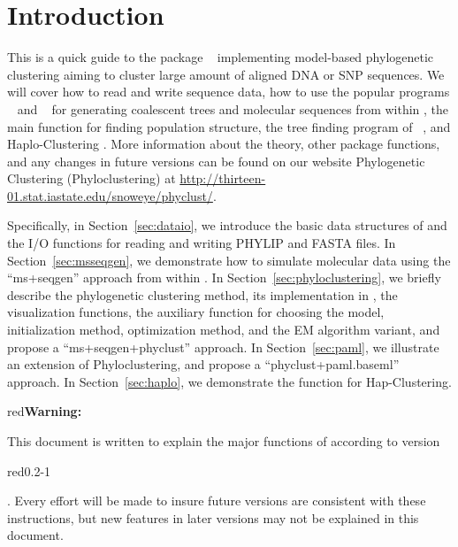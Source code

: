 
\section[Introduction]{Introduction}
\label{sec:introduction}

This is a quick guide to the package ~\citep{snoweye2011}
implementing model-based phylogenetic clustering aiming to cluster
large amount of aligned DNA or SNP sequences.
We will cover how to read and write sequence data,
how to use the popular programs ~\citep{Hudson2002} and ~\citep{Rambaut1997} for generating
coalescent trees and molecular sequences from within ,
the main function  for finding population structure,
the tree finding program  of ~\citep{Yang1997,Yang2007},
and Haplo-Clustering \citep{tzeng2005}.
More information about the theory, other package functions,
and any changes in future versions can be found on our website
Phylogenetic Clustering (Phyloclustering) at
\url{http://thirteen-01.stat.iastate.edu/snoweye/phyclust/}.

Specifically, in Section~\ref{sec:dataio}, we introduce the basic data structures
of  and the I/O functions for reading and writing 
PHYLIP and FASTA files. In Section~\ref{sec:msseqgen},
we demonstrate how to simulate molecular data using the ``ms+seqgen'' approach from within .
In Section~\ref{sec:phyloclustering}, we briefly describe
the phylogenetic clustering method, its implementation in , the visualization functions,
the auxiliary function  for choosing the model, initialization method, optimization method,
and the EM algorithm variant, and propose a ``ms+seqgen+phyclust'' approach.
In Section~\ref{sec:paml}, we illustrate an extension of Phyloclustering, and
propose a ``phyclust+paml.baseml'' approach.
In Section~\ref{sec:haplo}, we demonstrate the function
 for Hap-Clustering.

\begin{color}{red}\bf Warning:\end{color}
This document is written to explain the major functions of 
according to version \begin{color}{red}0.2-1\end{color}.
Every effort will be made to insure future versions are consistent with these
instructions, but new features in later versions may not be explained in this
document.




